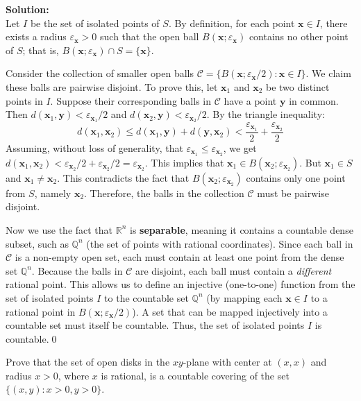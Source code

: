 \bigskip\noindent\textbf{Solution:}\\
Let $I$ be the set of isolated points of $S$. By definition, for each point $\mathbf{x} \in I$, there exists a radius $\varepsilon_{\mathbf{x}} > 0$ such that the open ball $B(\mathbf{x}; \varepsilon_{\mathbf{x}})$ contains no other point of $S$; that is, $B(\mathbf{x}; \varepsilon_{\mathbf{x}}) \cap S = \{\mathbf{x}\}$.

Consider the collection of smaller open balls $\mathcal{C} = \{ B(\mathbf{x}; \varepsilon_{\mathbf{x}}/2) : \mathbf{x} \in I \}$. We claim these balls are pairwise disjoint.
To prove this, let $\mathbf{x}_1$ and $\mathbf{x}_2$ be two distinct points in $I$. Suppose their corresponding balls in $\mathcal{C}$ have a point $\mathbf{y}$ in common. Then $d(\mathbf{x}_1, \mathbf{y}) < \varepsilon_{\mathbf{x}_1}/2$ and $d(\mathbf{x}_2, \mathbf{y}) < \varepsilon_{\mathbf{x}_2}/2$.
By the triangle inequality:
$$d(\mathbf{x}_1, \mathbf{x}_2) \le d(\mathbf{x}_1, \mathbf{y}) + d(\mathbf{y}, \mathbf{x}_2) < \frac{\varepsilon_{\mathbf{x}_1}}{2} + \frac{\varepsilon_{\mathbf{x}_2}}{2}$$
Assuming, without loss of generality, that $\varepsilon_{\mathbf{x}_1} \le \varepsilon_{\mathbf{x}_2}$, we get $d(\mathbf{x}_1, \mathbf{x}_2) < \varepsilon_{\mathbf{x}_2}/2 + \varepsilon_{\mathbf{x}_2}/2 = \varepsilon_{\mathbf{x}_2}$.
This implies that $\mathbf{x}_1 \in B(\mathbf{x}_2; \varepsilon_{\mathbf{x}_2})$. But $\mathbf{x}_1 \in S$ and $\mathbf{x}_1 \neq \mathbf{x}_2$. This contradicts the fact that $B(\mathbf{x}_2; \varepsilon_{\mathbf{x}_2})$ contains only one point from $S$, namely $\mathbf{x}_2$.
Therefore, the balls in the collection $\mathcal{C}$ must be pairwise disjoint.

Now we use the fact that $\mathbb{R}^n$ is \textbf{separable}, meaning it contains a countable dense subset, such as $\mathbb{Q}^n$ (the set of points with rational coordinates).
Since each ball in $\mathcal{C}$ is a non-empty open set, each must contain at least one point from the dense set $\mathbb{Q}^n$. Because the balls in $\mathcal{C}$ are disjoint, each ball must contain a \textit{different} rational point.
This allows us to define an injective (one-to-one) function from the set of isolated points $I$ to the countable set $\mathbb{Q}^n$ (by mapping each $\mathbf{x} \in I$ to a rational point in $B(\mathbf{x}; \varepsilon_{\mathbf{x}}/2)$). A set that can be mapped injectively into a countable set must itself be countable.
Thus, the set of isolated points $I$ is countable.\qed


\begin{problembox}
Prove that the set of open disks in the \(xy\)-plane with center at \( (x, x) \) and radius \( x > 0 \), where \( x \) is rational, is a countable covering of the set \( \{(x, y) : x > 0, y > 0\} \).
\end{problembox}

